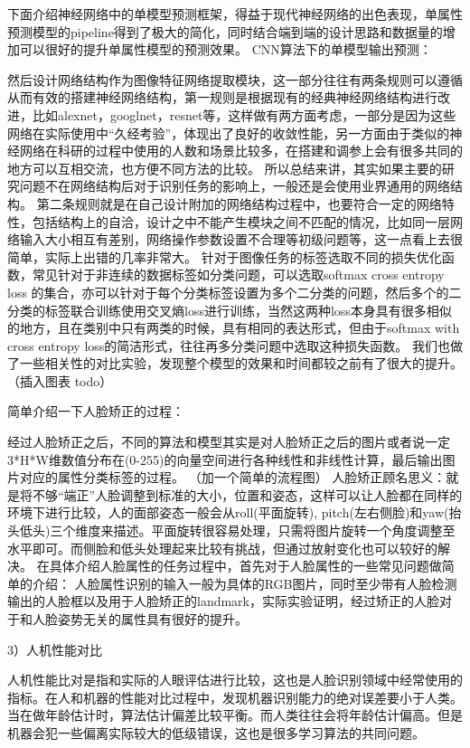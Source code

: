 下面介绍神经网络中的单模型预测框架，得益于现代神经网络的出色表现，单属性预测模型的pipeline得到了极大的简化，同时结合端到端的设计思路和数据量的增加可以很好的提升单属性模型的预测效果。
CNN算法下的单模型输出预测：


然后设计网络结构作为图像特征网络提取模块，这一部分往往有两条规则可以遵循从而有效的搭建神经网络结构，第一规则是根据现有的经典神经网络结构进行改进，比如alexnet，googlnet，resnet等，这样做有两方面考虑，一部分是因为这些网络在实际使用中“久经考验”，体现出了良好的收敛性能，另一方面由于类似的神经网络在科研的过程中使用的人数和场景比较多，在搭建和调参上会有很多共同的地方可以互相交流，也方便不同方法的比较。
所以总结来讲，其实如果主要的研究问题不在网络结构后对于识别任务的影响上，一般还是会使用业界通用的网络结构。
第二条规则就是在自己设计附加的网络结构过程中，也要符合一定的网络特性，包括结构上的自洽，设计之中不能产生模块之间不匹配的情况，比如同一层网络输入大小相互有差别，网络操作参数设置不合理等初级问题等，这一点看上去很简单，实际上出错的几率非常大。
针对于图像任务的标签选取不同的损失优化函数，常见针对于非连续的数据标签如分类问题，可以选取softmax cross entropy loss	的集合，亦可以针对于每个分类标签设置为多个二分类的问题，然后多个的二分类的标签联合训练使用交叉熵loss进行训练，当然这两种loss本身具有很多相似的地方，且在类别中只有两类的时候，具有相同的表达形式，但由于softmax with cross entropy loss的简洁形式，往往再多分类问题中选取这种损失函数。
我们也做了一些相关性的对比实验，发现整个模型的效果和时间都较之前有了很大的提升。
（插入图表 todo）

简单介绍一下人脸矫正的过程：

经过人脸矫正之后，不同的算法和模型其实是对人脸矫正之后的图片或者说一定3*H*W维数值分布在(0-255)的向量空间进行各种线性和非线性计算，最后输出图片对应的属性分类标签的过程。
（加一个简单的流程图）
人脸矫正顾名思义：就是将不够“端正”人脸调整到标准的大小，位置和姿态，这样可以让人脸都在同样的环境下进行比较，人的面部姿态一般会从roll(平面旋转), pitch(左右侧脸)和yaw(抬头低头)三个维度来描述。平面旋转很容易处理，只需将图片旋转一个角度调整至水平即可。而侧脸和低头处理起来比较有挑战，但通过放射变化也可以较好的解决。
在具体介绍人脸属性的任务过程中，首先对于人脸属性的一些常见问题做简单的介绍：
人脸属性识别的输入一般为具体的RGB图片，同时至少带有人脸检测输出的人脸框以及用于人脸矫正的landmark，实际实验证明，经过矫正的人脸对于和人脸姿势无关的属性具有很好的提升。

3）人机性能对比

人机性能比对是指和实际的人眼评估进行比较，这也是人脸识别领域中经常使用的指标。在人和机器的性能对比过程中，发现机器识别能力的绝对误差要小于人类。当在做年龄估计时，算法估计偏差比较平衡。而人类往往会将年龄估计偏高。但是机器会犯一些偏离实际较大的低级错误，这也是很多学习算法的共同问题。
